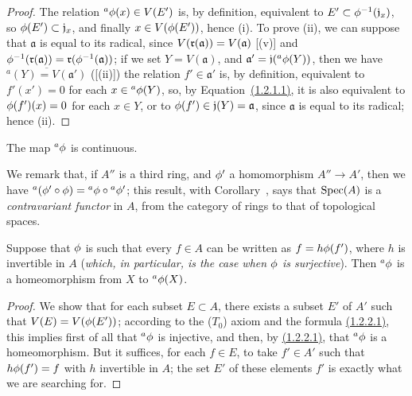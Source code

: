 \begin{proof}
The relation ${}^a\phi(x)\in V(E')$ is, by definition, equivalent to $E'\subset\phi^{-1}(\mathfrak{j}_x)$, so $\phi(E')\subset\mathfrak{j}_x$, and finally $x\in V(\phi(E'))$, hence (i).
To prove (ii), we can suppose that $\mathfrak{a}$ is equal to its radical, since $V(\mathfrak{r}(\mathfrak{a}))=V(\mathfrak{a})$ [(v)] and $\phi^{-1}(\mathfrak{r}(\mathfrak{a}))=\mathfrak{r}(\phi^{-1}(\mathfrak{a}))$;
if we set $Y=V(\mathfrak{a})$, and $\mathfrak{a}'=\mathfrak{j}({}^a\phi(Y))$, then we have $\overline{{}^a(Y)=V(\mathfrak{a}')}$ ([(ii)])
the relation $f'\in\mathfrak{a}'$ is, by definition, equivalent to $f'(x')=0$ for each $x\in{{}^a\phi(Y)}$, so, by Equation~\hyperref[1.1.2.1]{(1.2.1.1)}, it is also equivalent to $\phi(f')(x)=0$ for each $x\in Y$, or to $\phi(f')\in\mathfrak{j}(Y)=\mathfrak{a}$, since $\mathfrak{a}$ is equal to its radical;
hence (ii).
\end{proof}

\begin{corollary}[1.2.3]
\label{I.1.2.3}
The map ${}^a\phi$ is continuous.
\end{corollary}

We remark that, if $A''$ is a third ring, and $\phi'$ a homomorphism $A''\to A'$, then we have ${}^a(\phi'\circ\phi)={}^a\phi\circ{}^a\phi'$;
this result, with Corollary~, says that $\operatorname{Spec}(A)$ is a \emph{contravariant functor} in $A$, from the category of rings to that of topological spaces.

\begin{corollary}[1.2.4]
\label{I.1.2.4}
Suppose that $\phi$ is such that every $f\in A$ can be written as $f=h\phi(f')$, where $h$ is invertible in $A$ (\emph{which, in particular, is the case when $\phi$ is \emph{surjective}}).
Then ${}^a\phi$ is a homeomorphism from $X$ to ${}^a\phi(X)$.
\end{corollary}

\begin{proof}
We show that for each subset $E\subset A$, there exists a subset $E'$ of $A'$ such that $V(E)=V(\phi(E'))$;
according to the ($T_0$) axiom  and the formula \hyperref[1.1.2.2]{(1.2.2.1)}, this implies first of all that ${}^a\phi$ is injective, and then, by \hyperref[1.1.2.2]{(1.2.2.1)}, that ${}^a\phi$ is a homeomorphism.
But it suffices, for each $f\in E$, to take $f'\in A'$ such that $h\phi(f')=f$ with $h$ invertible in $A$;
the set $E'$ of these elements $f'$ is exactly what we are searching for.
\end{proof}

